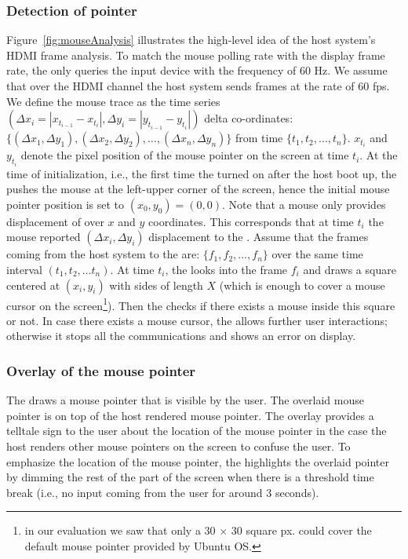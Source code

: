 \subsubsection{Detection of pointer} Figure~\ref{fig:mouseAnalysis} illustrates the high-level idea of the host system's HDMI frame analysis. To match the mouse polling rate with the display frame rate, the \device only queries the input device with the frequency of $60$ Hz. We assume that over the HDMI channel the host system sends frames at the rate of $60$ fps. We define the mouse trace as the time series $(\Delta x_i = |x_{t_{i-1}} - x_{t_{i}}|, \Delta y_i=|y_{t_{i-1}} - y_{t_{i}}|)$ delta co-ordinates: $\{(\Delta x_1, \Delta y_1), (\Delta x_2, \Delta y_2), \ldots, (\Delta x_n, \Delta y_n)\}$ from time $\{t_1, t_2, \ldots, t_n\}$. $x_{t_{i}}$ and $y_{t_{i}}$ denote the pixel position of the mouse pointer on the screen at time $t_i$. At the time of initialization, i.e., the first time the \device turned on after the host boot up, the \device pushes the mouse at the left-upper corner of the screen, hence the initial mouse pointer position is set to $(x_0, y_0) = (0, 0)$.  
Note that a mouse only provides displacement of over $x$ and $y$ coordinates. This corresponds that at time $t_i$ the mouse reported $(\Delta x_i, \Delta y_i)$ displacement to the \device. Assume that the frames coming from the host system to the \device are: $\{f_1, f_2, \ldots, f_n\}$ over the same time interval $(t_1, t_2,\ldots t_n)$. At time $t_i$, the \device looks into the frame $f_i$ and draws a square centered at $(x_i, y_i)$ with sides of length $X$ (which is enough to cover a mouse cursor on the screen\footnote{in our evaluation we saw that only a 30 $\times$ 30 square px. could cover the default mouse pointer provided by Ubuntu OS.}). Then the \device checks if there exists a mouse inside this square or not. In case there exists a mouse cursor, the \device allows further user interactions; otherwise it stops all the communications and shows an error on display.

\subsubsection{Overlay of the mouse pointer} The \device draws a mouse pointer that is visible by the user. The overlaid mouse pointer is on top of the host rendered mouse pointer. The overlay provides a telltale sign to the user about the location of the mouse pointer in the case the host renders other mouse pointers on the screen to confuse the user. To emphasize the location of the mouse pointer, the \device highlights the overlaid pointer by dimming the rest of the part of the screen when there is a threshold time break (i.e., no input coming from the user for around 3 seconds).


